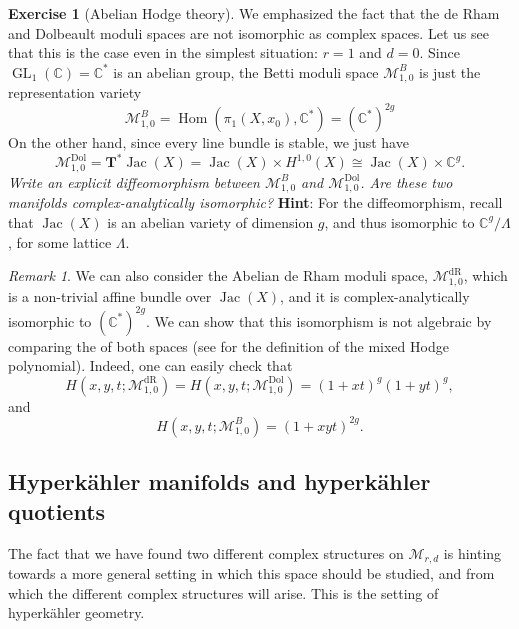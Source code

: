 \documentclass[12pt,a4paper]{amsbook}
\theoremstyle{remark} \newtheorem{rmk}[thm]{Remark}
\theoremstyle{definition} \newtheorem{defn}[thm]{Definition}
\theoremstyle{definition} \newtheorem{ex}[thm]{Example}
\theoremstyle{definition} \newtheorem{ej}{Exercise}
\let\emph\relax
\newcommand{\C}{\mathbb C}
\newcommand{\cM}{\mathcal M}
\newcommand{\dR}{\mathrm{dR}}
\newcommand{\Dol}{\mathrm{Dol}}
\DeclareMathOperator{\Hom}{Hom}
\DeclareMathOperator{\Jac}{Jac}
\DeclareMathOperator{\GL}{GL}
\begin{document}
\begin{ej}[Abelian Hodge theory]
  We emphasized the fact that the de Rham and Dolbeault moduli spaces are not isomorphic as complex spaces. Let us see that this is the case even in the simplest situation: $r=1$ and $d=0$. Since $\GL_1(\C)=\C^*$ is an abelian group, the Betti moduli space $\cM_{1,0}^B$ is just the representation variety
  \begin{equation*}
\cM_{1,0}^B = \Hom(\pi_1(X,x_0),\C^*) = (\C^*)^{2g}
  \end{equation*}
On the other hand, since every line bundle is stable, we just have
\begin{equation*}
\cM_{1,0}^{\Dol} = \bm{T}^* \Jac(X) = \Jac(X) \times H^{1,0}(X) \cong \Jac(X) \times \C^{g}.
\end{equation*}
\textit{Write an explicit diffeomorphism between $\cM_{1,0}^B$ and $\cM_{1,0}^{\Dol}$. Are these two manifolds complex-analytically isomorphic?} \textbf{Hint}: For the diffeomorphism, recall that $\Jac(X)$ is an abelian variety of dimension $g$, and thus isomorphic to $\C^g/\Lambda$, for some lattice $\Lambda$.
\end{ej}

\begin{rmk}
  We can also consider the Abelian de Rham moduli space, $\cM_{1,0}^{\dR}$, which is a non-trivial affine bundle over $\Jac(X)$, and it is complex-analytically isomorphic to $(\C^*)^{2g}$. We can show that this isomorphism is not algebraic by comparing the \emph{mixed Hodge polynomials} of both spaces (see \cite[Section 2.2]{HauselMSNAHT} for the definition of the mixed Hodge polynomial). Indeed, one can easily check that
  \begin{equation*}
H(x,y,t;\cM_{1,0}^{\dR}) = H(x,y,t;\cM_{1,0}^{\Dol}) = (1+xt)^g(1+yt)^g,
  \end{equation*}
  and
  \begin{equation*}
H(x,y,t;\cM_{1,0}^{B}) = (1+xyt)^{2g}.
  \end{equation*}

\end{rmk}

\subsection*{Hyperkähler manifolds and hyperkähler quotients}
The fact that we have found two different complex structures on $\cM_{r,d}$ is hinting towards a more general setting in which this space should be studied, and from which the different complex structures will arise. This is the setting of hyperkähler geometry.
\end{document}
